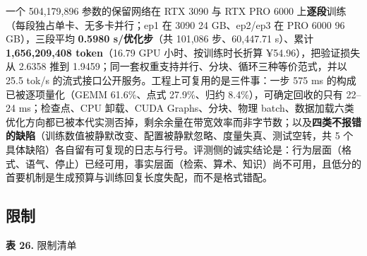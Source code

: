 \documentclass[11pt,openany]{ctexart}
\begin{document}
一个 504,179,896 参数的保留网络在 RTX 3090 与 RTX PRO 6000 上\textbf{逐段}训练（每段独占单卡、无多卡并行；ep1 在 3090 24 GB、ep2/ep3 在 PRO 6000 96 GB），三段平均 \textbf{0.5980 s/优化步}（共 101,086 步、60,447.71 s）、累计 \textbf{1,656,209,408 token}（16.79 GPU 小时、按训练时长折算 ¥54.96），把验证损失从 2.6358 推到 1.9459；同一套权重支持并行、分块、循环三种等价范式，并以 25.5 tok/s 的流式接口公开服务。工程上可复用的是三件事：一步 575 ms 的构成已被逐项量化（GEMM 61.6\allowbreak{}\%、点式 27.9\allowbreak{}\%、归约 8.4\allowbreak{}\%），可确定回收的只有 22–24 ms；检查点、CPU 卸载、CUDA Graphs、分块、物理 batch、数据加载六类优化方向都已被本代实测否掉，剩余余量在带宽效率而非字节数；以及\textbf{四类不报错的缺陷}（训练数值被静默改变、配置被静默忽略、度量失真、测试空转，共 5 个具体缺陷）各自留有可复现的日志与行号。评测侧的诚实结论是：行为层面（格式、语气、停止）已经可用，事实层面（检索、算术、知识）尚不可用，且低分的首要机制是生成预算与训练回复长度失配，而不是格式错配。

\subsection{限制}

\noindent\textbf{表 26.} 限制清单
\end{document}

